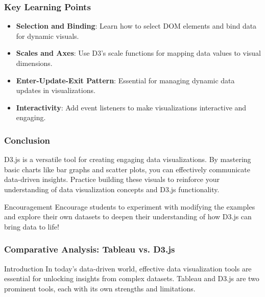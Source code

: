 \documentclass{beamer}
\begin{document}
\begin{frame}[fragile]
    \frametitle{Key Learning Points}
    \begin{itemize}
        \item \textbf{Selection and Binding}: Learn how to select DOM elements and bind data for dynamic visuals.
        \item \textbf{Scales and Axes}: Use D3’s scale functions for mapping data values to visual dimensions.
        \item \textbf{Enter-Update-Exit Pattern}: Essential for managing dynamic data updates in visualizations.
        \item \textbf{Interactivity}: Add event listeners to make visualizations interactive and engaging.
    \end{itemize}
\end{frame}

\begin{frame}
    \frametitle{Conclusion}
    D3.js is a versatile tool for creating engaging data visualizations. By mastering basic charts like bar graphs and scatter plots, you can effectively communicate data-driven insights. Practice building these visuals to reinforce your understanding of data visualization concepts and D3.js functionality.

    \begin{block}{Encouragement}
        Encourage students to experiment with modifying the examples and explore their own datasets to deepen their understanding of how D3.js can bring data to life!
    \end{block}
\end{frame}

\begin{frame}[fragile]
    \frametitle{Comparative Analysis: Tableau vs. D3.js}
    \begin{block}{Introduction}
        In today’s data-driven world, effective data visualization tools are essential for unlocking insights from complex datasets. Tableau and D3.js are two prominent tools, each with its own strengths and limitations.
    \end{block}
\end{frame}
\end{document}
